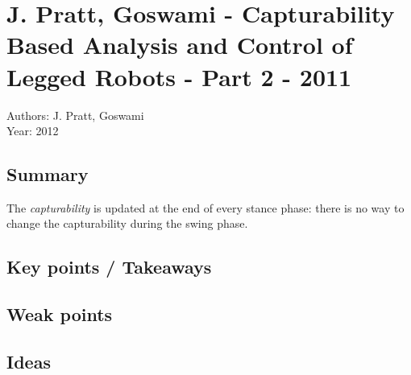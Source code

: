 \section{J. Pratt, Goswami - Capturability Based Analysis and Control of Legged Robots - Part 2 \cite{Koolen:2012:CAC:2344876.2344877} - 2011}
Authors: J. Pratt, Goswami\\
Year: 2012
\subsection*{Summary}
The \textit{capturability} is updated at the end of every stance phase: there is no way to change the capturability during the swing phase.

\subsection*{Key points / Takeaways}
\subsection*{Weak points}
\subsection*{Ideas}

